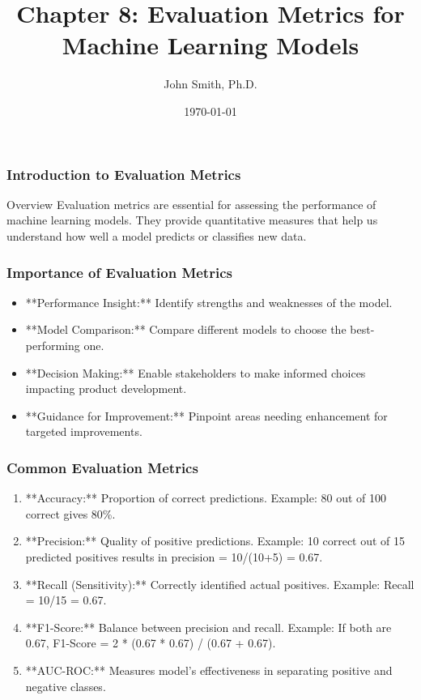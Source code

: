 \documentclass[aspectratio=169]{beamer}
\title[Chapter 8]{Chapter 8: Evaluation Metrics for Machine Learning Models}
\author[J. Smith]{John Smith, Ph.D.}
\institute[University Name]{
  Department of Computer Science\\
  University Name\\
  \vspace{0.3cm}
  Email: email@university.edu\\
  Website: www.university.edu
}
\date{\today}
\begin{document}
\frame{\titlepage}

\begin{frame}[fragile]
    \frametitle{Introduction to Evaluation Metrics}
    \begin{block}{Overview}
        Evaluation metrics are essential for assessing the performance of machine learning models. They provide quantitative measures that help us understand how well a model predicts or classifies new data.
    \end{block}
\end{frame}

\begin{frame}[fragile]
    \frametitle{Importance of Evaluation Metrics}
    \begin{itemize}
        \item **Performance Insight:** Identify strengths and weaknesses of the model.
        \item **Model Comparison:** Compare different models to choose the best-performing one.
        \item **Decision Making:** Enable stakeholders to make informed choices impacting product development.
        \item **Guidance for Improvement:** Pinpoint areas needing enhancement for targeted improvements.
    \end{itemize}
\end{frame}

\begin{frame}[fragile]
    \frametitle{Common Evaluation Metrics}
    \begin{enumerate}
        \item **Accuracy:** Proportion of correct predictions. Example: 80 out of 100 correct gives 80\%.
        \item **Precision:** Quality of positive predictions. Example: 10 correct out of 15 predicted positives results in precision = 10/(10+5) = 0.67.
        \item **Recall (Sensitivity):** Correctly identified actual positives. Example: Recall = 10/15 = 0.67.
        \item **F1-Score:** Balance between precision and recall. Example: If both are 0.67, F1-Score = 2 * (0.67 * 0.67) / (0.67 + 0.67).
        \item **AUC-ROC:** Measures model's effectiveness in separating positive and negative classes.
    \end{enumerate}
\end{frame}
\end{document}

